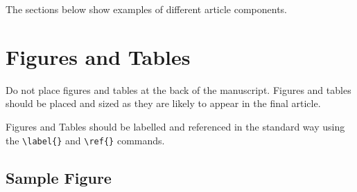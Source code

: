 \documentclass[9pt,twocolumn,twoside]{opticajnl}
\begin{document}







The sections below show examples of different article components.

\section{Figures and Tables}

Do not place figures and tables at the back of the manuscript. Figures and tables should be placed and sized as they are likely to appear in the final article. 

Figures and Tables should be labelled and referenced in the standard way using the \verb|\label{}| and \verb|\ref{}| commands.

\subsection{Sample Figure}
\end{document}
